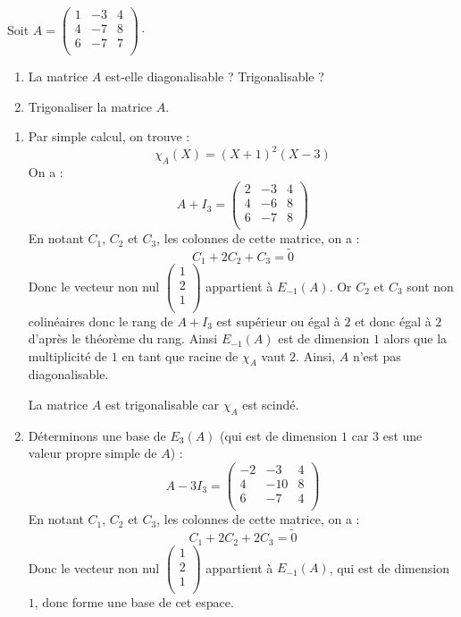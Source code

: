 \documentclass[a4paper,10pt]{report}
\begin{document}
\begin{Exercice}{} Soit $A= \begin{pmatrix}
1 & -3 & 4 \\
4 & -7 & 8 \\
6 & -7 & 7 \\
\end{pmatrix}\cdot$

\begin{enumerate}
\item La matrice $A$ est-elle diagonalisable ? Trigonalisable ?
\item Trigonaliser la matrice $A$. 
\end{enumerate}
\end{Exercice}

\corr 

\begin{enumerate}
\item Par simple calcul, on trouve :
$$ \chi_A(X) = (X+1)^2(X-3)$$
On a :
$$ A+I_3 =  \begin{pmatrix}
2 & -3 & 4 \\
4 & -6 & 8 \\
6 & -7 & 8 \\
\end{pmatrix}$$
En notant $C_1$, $C_2$ et $C_3$, les colonnes de cette matrice, on a :
$$ C_1+2C_2+C_3= \tilde{0}$$
Donc le vecteur non nul $\begin{pmatrix}
1 \\
2 \\
1 \\
\end{pmatrix}$ appartient à $E_{-1}(A)$. Or $C_2$ et $C_3$ sont non colinéaires donc le rang de $A+I_3$ est supérieur ou égal à $2$ et donc égal à $2$ d'après le théorème du rang. Ainsi $E_{-1}(A)$ est de dimension $1$ alors que la multiplicité de $1$ en tant que racine de $\chi_A$ vaut $2$. Ainsi, $A$ n'est pas diagonalisable.

\medskip

\noindent La matrice $A$ est trigonalisable car $\chi_A$ est scindé.
\item Déterminons une base de $E_3(A)$ (qui est de dimension $1$ car $3$ est une valeur propre simple de $A$) :
$$ A- 3I_3 = \begin{pmatrix}
-2 & -3 & 4 \\
4 & -10 & 8 \\
6 & -7 & 4 \\
\end{pmatrix}$$
En notant $C_1$, $C_2$ et $C_3$, les colonnes de cette matrice, on a :
$$ C_1+2C_2+2C_3= \tilde{0}$$
Donc le vecteur non nul $\begin{pmatrix}
1 \\
2 \\
1 \\
\end{pmatrix}$ appartient à $E_{-1}(A)$, qui est de dimension $1$, donc forme une base de cet espace. 


\end{enumerate}
\end{document}
